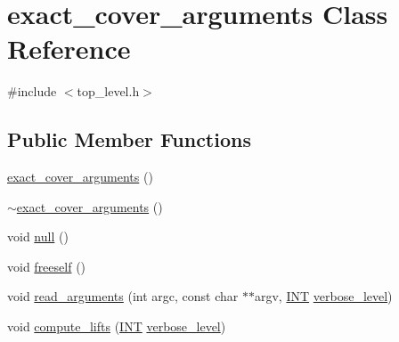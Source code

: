 \hypertarget{classexact__cover__arguments}{}\section{exact\+\_\+cover\+\_\+arguments Class Reference}
\label{classexact__cover__arguments}


{\ttfamily \#include $<$top\+\_\+level.\+h$>$}

\subsection*{Public Member Functions}
\begin{DoxyCompactItemize}
\item 
\mbox{\hyperlink{classexact__cover__arguments_a568649c5869d4322939c499db6a0d824}{exact\+\_\+cover\+\_\+arguments}} ()
\item 
\mbox{\hyperlink{classexact__cover__arguments_a30625bd3601bfb610f56c528e16a3aa7}{$\sim$exact\+\_\+cover\+\_\+arguments}} ()
\item 
void \mbox{\hyperlink{classexact__cover__arguments_a6d12eccba6d5e0b3745e7ba3251b7dbb}{null}} ()
\item 
void \mbox{\hyperlink{classexact__cover__arguments_a5eca187fe1f1d5bf05d6084413a901a8}{freeself}} ()
\item 
void \mbox{\hyperlink{classexact__cover__arguments_a3bd1ee047fa0b9d273f4cc8263320697}{read\+\_\+arguments}} (int argc, const char $\ast$$\ast$argv, \mbox{\hyperlink{galois_8h_a09fddde158a3a20bd2dcadb609de11dc}{I\+NT}} \mbox{\hyperlink{simeon_8_c_a818073fbcc2f439e7c56952f67386122}{verbose\+\_\+level}})
\item 
void \mbox{\hyperlink{classexact__cover__arguments_ab0cdb09a17201c89aa9f83bd511dbbf7}{compute\+\_\+lifts}} (\mbox{\hyperlink{galois_8h_a09fddde158a3a20bd2dcadb609de11dc}{I\+NT}} \mbox{\hyperlink{simeon_8_c_a818073fbcc2f439e7c56952f67386122}{verbose\+\_\+level}})
\end{DoxyCompactItemize}
